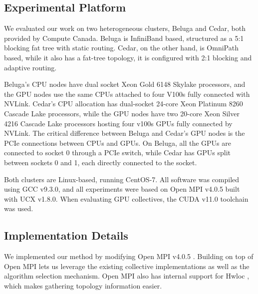 \subsection{Experimental Platform}\label{sec:CH4-experimental-platform}
We evaluated our work on two heterogeneous clusters, Beluga and Cedar, both provided by Compute Canada. 
Beluga is InfiniBand based, structured as a 5:1 blocking fat tree with static routing.  
Cedar, on the other hand, is OmniPath based, while it also has a fat-tree topology, it is configured with 2:1 blocking and adaptive routing.

Beluga's \gls{CPU} nodes have dual socket Xeon Gold 6148 Skylake processors, and the \gls{GPU} nodes use the same \gls{CPU}s attached to four V100s fully connected with NVLink.
Cedar's \gls{CPU} allocation has dual-socket 24-core Xeon Platinum 8260 Cascade Lake processors, while the \gls{GPU} nodes have two 20-core Xeon Silver 4216 Cascade Lake processors hosting four v100s \gls{GPU}s fully connected by NVLink.
The critical difference between Beluga and Cedar's \gls{GPU} nodes is the \gls{PCIe} connections between \gls{CPU}s and \gls{GPU}s.
On Beluga, all the \gls{GPU}s are connected to socket 0 through a \gls{PCIe} switch, while Cedar has \gls{GPU}s split between sockets 0 and 1, each directly connected to the socket.

Both clusters are Linux-based, running CentOS-7. 
All software was compiled using GCC v9.3.0, and all experiments were based on Open MPI v4.0.5 built with \gls{UCX} v1.8.0.
When evaluating \gls{GPU} collectives, the \gls{CUDA} v11.0 toolchain was used.

\subsection{Implementation Details}\label{sec:CH4-impl-details}
We implemented our method by modifying Open MPI v4.0.5 \cite{gabriel2004OpenMPI}.
Building on top of Open MPI lets us leverage the existing collective implementations as well as the algorithm selection mechanism.
Open MPI also has internal support for Hwloc \cite{Broquedis2010hwloc}, which makes gathering topology information easier.

